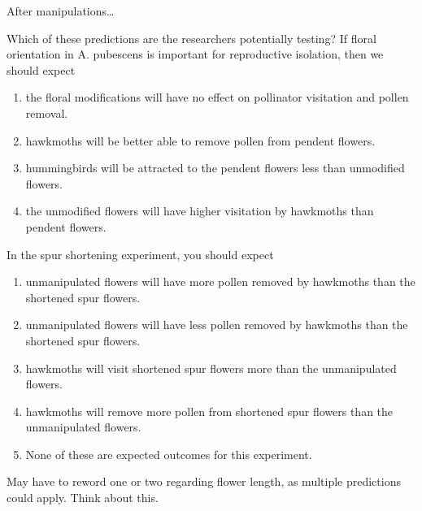 \documentclass[t]{beamer}
\newcommand{\ques}[1]{\highlight{\textsc{q#1:}}}
\begin{document}
%
\begin{frame}[t]{After manipulations\dots}
	
	
\end{frame}
%
\begin{frame}[t]{\ques9 Which of these predictions are the researchers potentially testing?}
	If floral orientation in A. pubescens is important for reproductive isolation, then we should expect
	
	\begin{enumerate}
		\item the floral modifications will have no effect on pollinator visitation and pollen removal.
		\item hawkmoths will be better able to remove pollen from pendent flowers.
		\item hummingbirds will be attracted to the pendent flowers less than unmodified flowers.
		\item the unmodified flowers will have higher visitation by hawkmoths than pendent flowers.
	\end{enumerate}
\end{frame}
%
\begin{frame}[t]{\ques{10} In the spur shortening experiment, you should expect }
	\begin{enumerate}
		\item unmanipulated flowers will have more pollen removed by hawkmoths than the shortened spur flowers.
		\item unmanipulated  flowers will have less pollen removed by hawkmoths than the shortened spur flowers.
		\item hawkmoths will visit shortened spur flowers more than the unmanipulated flowers.
		\item hawkmoths will remove more pollen from shortened spur flowers than the unmanipulated flowers.
		\item None of these are expected outcomes for this experiment.
	\end{enumerate}

	\hangpara May have to reword one or two regarding flower length, as multiple predictions could apply. Think about this.
\end{frame}
%
\end{document}

